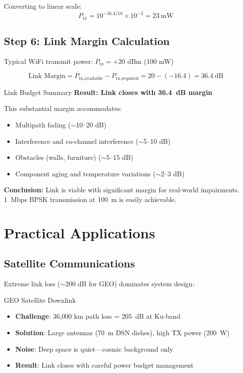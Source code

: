 Converting to linear scale:
\begin{equation}
P_{\text{tx}} = 10^{-16.4/10} \times 10^{-3} = 23\ \text{mW}
\end{equation}

\subsection*{Step 6: Link Margin Calculation}

Typical WiFi transmit power: $P_{\text{tx}} = +20$ dBm (100 mW)

\begin{equation}
\text{Link Margin} = P_{\text{tx,available}} - P_{\text{tx,required}} = 20 - (-16.4) = 36.4\ \text{dB}
\end{equation}

\begin{calloutbox}[colback=black!8!white,colframe=black]{Link Budget Summary}
\textbf{Result: Link closes with 36.4~dB margin}

This substantial margin accommodates:
\begin{itemize}
\item Multipath fading ($\sim$10--20 dB)
\item Interference and co-channel interference ($\sim$5--10 dB)
\item Obstacles (walls, furniture) ($\sim$5--15 dB)
\item Component aging and temperature variations ($\sim$2--3 dB)
\end{itemize}

\textbf{Conclusion:} Link is viable with significant margin for real-world impairments. 1~Mbps BPSK transmission at 100~m is easily achievable.
\end{calloutbox}

\section{Practical Applications}

\subsection{Satellite Communications}

Extreme link loss ($\sim$200 dB for GEO) dominates system design:

\begin{calloutbox}{GEO Satellite Downlink}
\begin{itemize}
\item \textbf{Challenge}: 36,000 km path loss = 205~dB at Ku-band
\item \textbf{Solution}: Large antennas (70~m DSN dishes), high TX power (200~W)
\item \textbf{Noise}: Deep space is quiet---cosmic background only
\item \textbf{Result}: Link closes with careful power budget management
\end{itemize}
\end{calloutbox}

